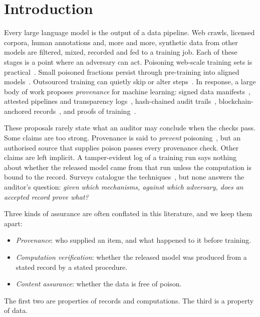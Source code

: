 \section{Introduction}\label{sec:intro}

Every large language model is the output of a data pipeline. Web crawls, licensed corpora,
human annotations and, more and more, synthetic data from other models are filtered, mixed,
recorded and fed to a training job. Each of these stages is a point where an adversary can
act. Poisoning web-scale training sets is practical~\cite{carlini2024poisoning}. Small
poisoned fractions persist through pre-training into aligned models~\cite{zhang2025persistent}.
Outsourced training can quietly skip or alter steps~\cite{jia2021pol,spoczynski2025atlas}.
In response, a large body of work proposes \emph{provenance} for machine learning: signed
data manifests~\cite{stokes2021prevent}, attested pipelines and transparency
logs~\cite{spoczynski2025atlas,duddu2025laminator}, hash-chained audit
trails~\cite{li2025auditablellm}, blockchain-anchored records~\cite{geren2025blockchain,mehammed2025fl},
and proofs of training~\cite{jia2021pol,abbaszadeh2024zkpot,liao2026verilora}.

These proposals rarely state what an auditor may conclude when the checks pass. Some
claims are too strong. Provenance is said to \emph{prevent} poisoning~\cite{stokes2021prevent},
but an authorised source that supplies poison passes every provenance check. Other claims
are left implicit. A tamper-evident log of a training run says nothing about whether the
released model came from that run unless the computation is bound to the record. Surveys
catalogue the techniques~\cite{geren2025blockchain,lyu2026survey,peng2026zkp}, but none
answers the auditor's question: \emph{given which mechanisms, against which adversary, does
an accepted record prove what?}

Three kinds of assurance are often conflated in this literature, and we keep them apart:
\begin{itemize}
\item \emph{Provenance}: who supplied an item, and what happened to it before training.
\item \emph{Computation verification}: whether the released model was produced from a stated
  record by a stated procedure.
\item \emph{Content assurance}: whether the data is free of poison.
\end{itemize}
The first two are properties of records and computations. The third is a property of data.


